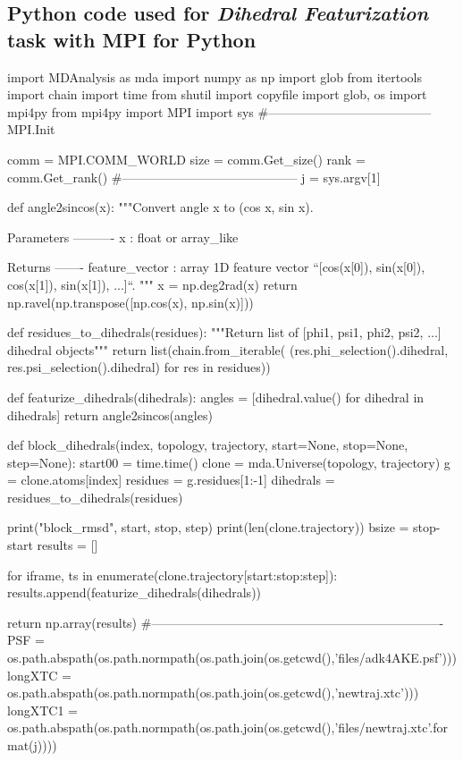 \subsection{Python code used for \emph{Dihedral Featurization} task with MPI for Python}
\label{sec:codeDihed}

\begin{python}
import MDAnalysis as mda
import numpy as np
import glob
from itertools import chain
import time
from shutil import copyfile
import glob, os
import mpi4py
from mpi4py import MPI
import sys
#---------------------------------------
MPI.Init

comm = MPI.COMM_WORLD
size = comm.Get_size()
rank = comm.Get_rank()
#------------------------------------------
j = sys.argv[1]

def angle2sincos(x):
    """Convert angle x to (cos x, sin x).
    
    Parameters
    ----------
    x : float or array_like
    
    Returns
    -------
    feature_vector : array
        1D feature vector ``[cos(x[0]), sin(x[0]), cos(x[1]), sin(x[1]), ...]``.
    """
    x = np.deg2rad(x)
    return np.ravel(np.transpose([np.cos(x), np.sin(x)]))

def residues_to_dihedrals(residues):
    """Return list of [phi1, psi1, phi2, psi2, ...] dihedral objects"""
    return list(chain.from_iterable(
            (res.phi_selection().dihedral, res.psi_selection().dihedral) for res in residues))

def featurize_dihedrals(dihedrals):
    angles = [dihedral.value() for dihedral in dihedrals]
    return angle2sincos(angles)
    
def block_dihedrals(index, topology, trajectory, start=None, stop=None, step=None):
    start00 = time.time()
    clone = mda.Universe(topology, trajectory)
    g = clone.atoms[index]
    residues = g.residues[1:-1]
    dihedrals = residues_to_dihedrals(residues)

    print("block_rmsd", start, stop, step)
    print(len(clone.trajectory))
    bsize = stop-start
    results = []

    for iframe, ts in enumerate(clone.trajectory[start:stop:step]):
        results.append(featurize_dihedrals(dihedrals))

    return np.array(results)
#----------------------------------------------------------------------
PSF = os.path.abspath(os.path.normpath(os.path.join(os.getcwd(),'files/adk4AKE.psf')))
longXTC = os.path.abspath(os.path.normpath(os.path.join(os.getcwd(),'newtraj.xtc')))
longXTC1 = os.path.abspath(os.path.normpath(os.path.join(os.getcwd(),'files/newtraj{}.xtc'.format(j))))


\end{python}
